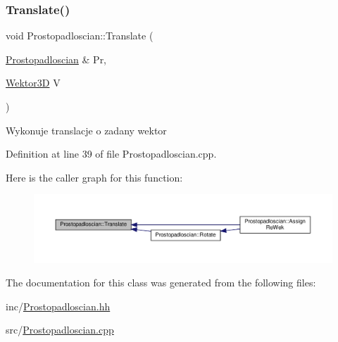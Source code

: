 \subsubsection{\texorpdfstring{Translate()}{Translate()}}
{\footnotesize\ttfamily void Prostopadloscian\+::\+Translate (\begin{DoxyParamCaption}\item[{\hyperlink{class_prostopadloscian}{Prostopadloscian} \&}]{Pr,  }\item[{\hyperlink{_wektor3_d_8hh_ac353a272b38b4ad342f7181ad7bdb91a}{Wektor3D}}]{V }\end{DoxyParamCaption})}

Wykonuje translacje o zadany wektor 

Definition at line 39 of file Prostopadloscian.\+cpp.

Here is the caller graph for this function\+:
\nopagebreak
\begin{figure}[H]
\begin{center}
\leavevmode
\includegraphics[width=350pt]{class_prostopadloscian_a4b5870cc10216feaf8a23e8f9088e3ac_icgraph}
\end{center}
\end{figure}


The documentation for this class was generated from the following files\+:\begin{DoxyCompactItemize}
\item 
inc/\hyperlink{_prostopadloscian_8hh}{Prostopadloscian.\+hh}\item 
src/\hyperlink{_prostopadloscian_8cpp}{Prostopadloscian.\+cpp}\end{DoxyCompactItemize}

